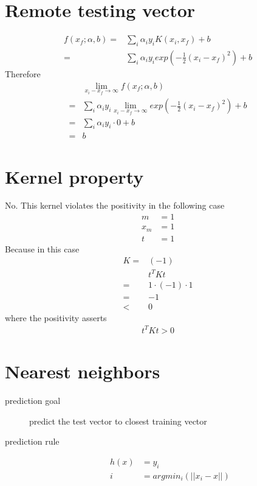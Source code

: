 \documentclass[12pt]{article}
\begin{document}
\begin{multicols}{2}
  \section{Remote testing vector}
  \begin{align*}
    f(x_f; \alpha,b)
    =& \sum_{i} \alpha_i y_i K(x_i, x_f) + b \\
    =& \sum_{i} \alpha_i y_i exp(-\frac{1}{2} (x_i - x_f)^2) + b
  \end{align*}
  Therefore
  \begin{align*}
    & \lim_{x_i-x_f \to \infty} f(x_f; \alpha,b) \\
    =& \sum_{i} \alpha_i y_i \lim_{x_i-x_f \to \infty} exp(-\frac{1}{2} (x_i - x_f)^2) + b \\
    =& \sum_{i} \alpha_i y_i \cdot 0 + b \\
    =& b
  \end{align*}
  \section{Kernel property}
  No. This kernel violates the positivity in the following case
  \begin{align*}
    m &= 1 \\
    x_m &= 1 \\
    t &= 1
  \end{align*}
  Because in this case
  \begin{align*}
    K =& (-1) \\
    & t^T K t \\
    =& 1 \cdot (-1) \cdot 1 \\
    =& -1 \\
    <& 0
  \end{align*}
  where the positivity asserts
  \begin{align*}
    t^T K t > 0
  \end{align*}

  \section{Nearest neighbors}
  \begin{description}
    \item[prediction goal] predict the test vector to closest training vector
    \item[prediction rule]
      \begin{align*}
        h(x) &= y_i\\
        i &= argmin_i (||x_i - x||)
      \end{align*}
  \end{description}


\end{multicols}
\end{document}
